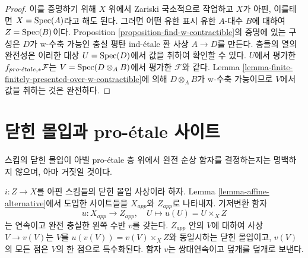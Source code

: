 \begin{proof}
이를 증명하기 위해 $X$ 위에서 Zariski 국소적으로 작업하고 $X$가
아핀, 이를테면 $X = \mathop{\mathrm{Spec}}(A)$라고 해도 된다. 그러면 어떤 유한 표시
유한 $A$-대수 $B$에 대하여 $Z = \mathop{\mathrm{Spec}}(B)$이다. Proposition
\ref{proposition-find-w-contractible}의 증명에 있는 구성은 $D$가
w-수축 가능인 충실 평탄 ind-\'etale 환 사상 $A \to D$를 만든다.
층들의 열의 완전성은 이러한 대상 $U = \mathop{\mathrm{Spec}}(D)$에서 값을 취하여
확인할 수 있다. $U$에서 평가한 $f_{{pro\text{-}\acute{e}tale}, *}\mathcal{F}$는
$V = \mathop{\mathrm{Spec}}(D \otimes_A B)$에서 평가한 $\mathcal{F}$와 같다.
Lemma \ref{lemma-finite-finitely-presented-over-w-contractible}에 의해
$D \otimes_A B$가 w-수축 가능이므로 $V$에서 값을 취하는 것은
완전하다.
\end{proof}








\section{닫힌 몰입과 pro-\'etale 사이트}
\label{section-closed-immersion}

\noindent
스킴의 닫힌 몰입이 아벨 pro-\'etale 층 위에서 완전 순상 함자를
결정하는지는 명백하지 않으며, 아마 거짓일 것이다.

\begin{lemma}
\label{lemma-closed-immersion-affines}
$i : Z \to X$를 아핀 스킴들의 닫힌 몰입 사상이라 하자. Lemma
\ref{lemma-affine-alternative}에서 도입한 사이트들을 $X_{app}$와
$Z_{app}$로 나타내자. 기저변환 함자
$$
u : X_{app} \to Z_{app},\quad U \longmapsto u(U) = U \times_X Z
$$
는 연속이고 완전 충실한 왼쪽 수반 $v$를 갖는다. $Z_{app}$ 안의
$V$에 대하여 사상 $V \to v(V)$는 $V$를
$u(v(V)) = v(V) \times_X Z$와 동일시하는 닫힌 몰입이고,
$v(V)$의 모든 점은 $V$의 한 점으로 특수화된다. 함자 $v$는
쌍대연속이고 덮개를 덮개로 보낸다.
\end{lemma}

